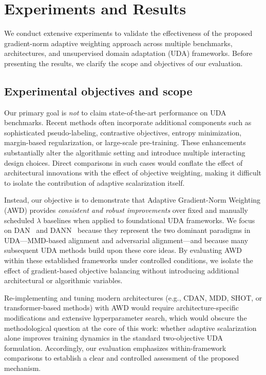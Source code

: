 \documentclass[pdflatex,sn-mathphys-num]{sn-jnl}
\theoremstyle{thmstyleone}
\theoremstyle{thmstyletwo}
\theoremstyle{thmstylethree}
\begin{document}
\section{Experiments and Results}
\label{sec:experiments}

We conduct extensive experiments to validate the effectiveness of the proposed gradient-norm adaptive weighting approach across multiple benchmarks, architectures, and unsupervised domain adaptation (UDA) frameworks. Before presenting the results, we clarify the scope and objectives of our evaluation.

\subsection{Experimental objectives and scope}

Our primary goal is \emph{not} to claim state-of-the-art performance on UDA benchmarks. Recent methods often incorporate additional components such as sophisticated pseudo-labeling, contrastive objectives, entropy minimization, margin-based regularization, or large-scale pre-training. These enhancements substantially alter the algorithmic setting and introduce multiple interacting design choices. Direct comparisons in such cases would conflate the effect of architectural innovations with the effect of objective weighting, making it difficult to isolate the contribution of adaptive scalarization itself.

Instead, our objective is to demonstrate that Adaptive Gradient-Norm Weighting (AWD) provides \emph{consistent and robust improvements} over fixed and manually scheduled $\lambda$ baselines when applied to foundational UDA frameworks. We focus on DAN~\cite{long2015dan} and DANN~\cite{ganin2016dann} because they represent the two dominant paradigms in UDA---MMD-based alignment and adversarial alignment---and because many subsequent UDA methods build upon these core ideas. By evaluating AWD within these established frameworks under controlled conditions, we isolate the effect of gradient-based objective balancing without introducing additional architectural or algorithmic variables.

Re-implementing and tuning modern architectures (e.g., CDAN, MDD, SHOT, or transformer-based methods) with AWD would require architecture-specific modifications and extensive hyperparameter search, which would obscure the methodological question at the core of this work: whether adaptive scalarization alone improves training dynamics in the standard two-objective UDA formulation. Accordingly, our evaluation emphasizes within-framework comparisons to establish a clear and controlled assessment of the proposed mechanism.
\end{document}
